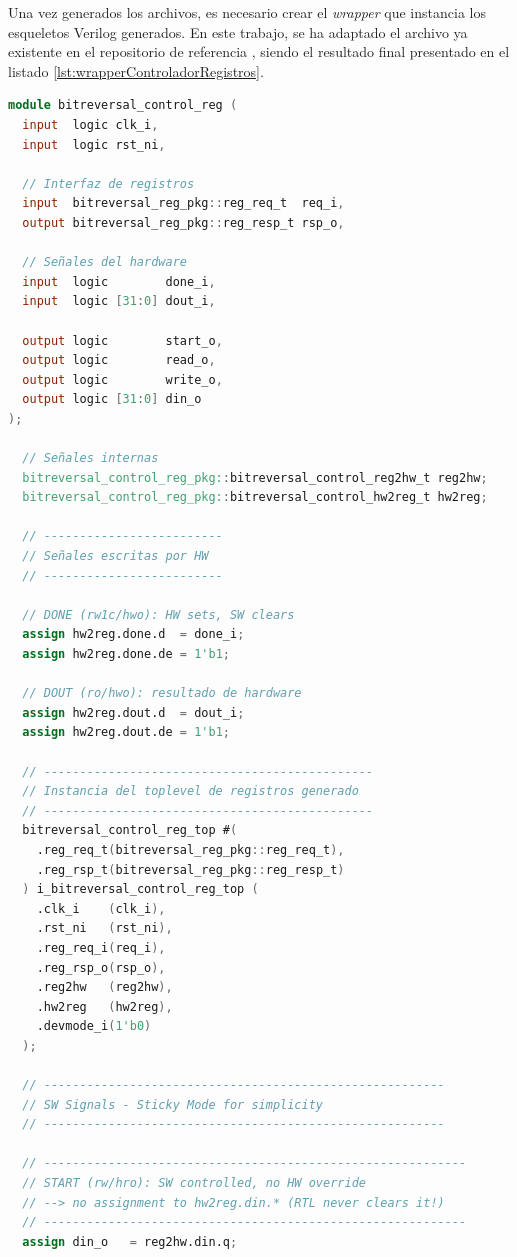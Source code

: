 Una vez generados los archivos, es necesario crear el \emph{wrapper} que instancia los esqueletos Verilog generados. En este trabajo, se ha adaptado el archivo ya existente en el repositorio de referencia \cite{simple-cnt}, siendo el resultado final presentado en el listado \ref{lst:wrapperControladorRegistros}.

\begin{lstlisting}[language=verilog,frame=single,caption={Código fuente del testbench},showstringspaces=false,label=lst:wrapperControladorRegistros]
module bitreversal_control_reg (
  input  logic clk_i,
  input  logic rst_ni,

  // Interfaz de registros
  input  bitreversal_reg_pkg::reg_req_t  req_i,
  output bitreversal_reg_pkg::reg_resp_t rsp_o,

  // Señales del hardware
  input  logic        done_i,
  input  logic [31:0] dout_i,

  output logic        start_o,
  output logic        read_o,
  output logic        write_o,
  output logic [31:0] din_o
);

  // Señales internas
  bitreversal_control_reg_pkg::bitreversal_control_reg2hw_t reg2hw;
  bitreversal_control_reg_pkg::bitreversal_control_hw2reg_t hw2reg;

  // -------------------------
  // Señales escritas por HW
  // -------------------------

  // DONE (rw1c/hwo): HW sets, SW clears
  assign hw2reg.done.d  = done_i;
  assign hw2reg.done.de = 1'b1;

  // DOUT (ro/hwo): resultado de hardware
  assign hw2reg.dout.d  = dout_i;
  assign hw2reg.dout.de = 1'b1;

  // ----------------------------------------------
  // Instancia del toplevel de registros generado
  // ----------------------------------------------
  bitreversal_control_reg_top #(
    .reg_req_t(bitreversal_reg_pkg::reg_req_t),
    .reg_rsp_t(bitreversal_reg_pkg::reg_resp_t)
  ) i_bitreversal_control_reg_top (
    .clk_i    (clk_i),
    .rst_ni   (rst_ni),
    .reg_req_i(req_i),
    .reg_rsp_o(rsp_o),
    .reg2hw   (reg2hw),
    .hw2reg   (hw2reg),
    .devmode_i(1'b0)
  );

  // --------------------------------------------------------
  // SW Signals - Sticky Mode for simplicity
  // --------------------------------------------------------

  // -----------------------------------------------------------
  // START (rw/hro): SW controlled, no HW override
  // --> no assignment to hw2reg.din.* (RTL never clears it!)
  // -----------------------------------------------------------
  assign din_o   = reg2hw.din.q;
  

\end{lstlisting}
